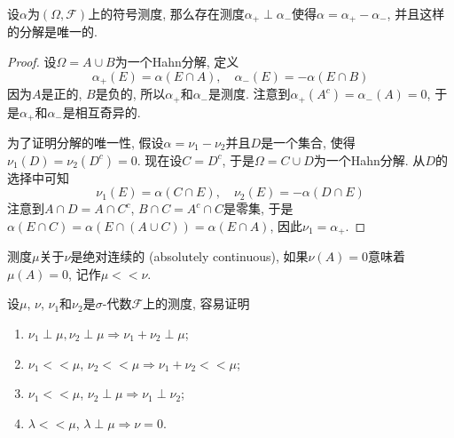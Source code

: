 \documentclass[cn, 12pt, math=mtpro2, bibstyle=apa, blue, twocol]{elegantbook}
\newcommand{\F}{\mathcal{F}}
\begin{document}
\begin{theorem}[Jordan分解定理]
  设$\alpha$为$(\Omega,\F)$上的符号测度, 那么存在测度$\alpha_+\perp\alpha_-$使得$\alpha=\alpha_+-\alpha_-$, 并且这样的分解是唯一的.
\end{theorem}
\begin{proof}
  设$\Omega=A\cup B$为一个Hahn分解, 定义
  $$\alpha_+(E)=\alpha(E\cap A),\quad \alpha_-(E)=-\alpha(E\cap B)$$
  因为$A$是正的, $B$是负的, 所以$\alpha_+$和$\alpha_-$是测度. 注意到$\alpha_+(A^c)=\alpha_-(A)=0$, 于是$\alpha_+$和$\alpha_-$是相互奇异的.

  为了证明分解的唯一性, 假设$\alpha=\nu_1-\nu_2$并且$D$是一个集合, 使得$\nu_1(D)=\nu_2(D^c)=0$. 现在设$C=D^c$, 于是$\Omega=C\cup D$为一个Hahn分解. 从$D$的选择中可知
  $$\nu_1(E)=\alpha(C\cap E),\quad \nu_2(E)=-\alpha(D\cap E)$$
  注意到$A\cap D=A\cap C^c$, $B\cap C=A^c\cap C$是零集, 于是$\alpha(E\cap C)=\alpha(E\cap (A\cup C))=\alpha(E\cap A)$, 因此$\nu_1=\alpha_+$.

\end{proof}
\begin{definition}
测度$\mu$关于$\nu$是绝对连续的 (absolutely continuous), 如果$\nu(A)=0$意味着$\mu(A)=0$, 记作$\mu<<\nu$.
\end{definition}
\begin{example}
设$\mu$, $\nu$, $\nu_1$和$\nu_2$是$\sigma$-代数$\F$上的测度, 容易证明
\begin{enumerate}[label=(\arabic*)]
  \item $\nu_1\perp\mu, \nu_2\perp\mu\Rightarrow \nu_1+\nu_2\perp\mu$;
  \item $\nu_1<<\mu$, $\nu_2<<\mu \Rightarrow \nu_1+\nu_2<<\mu$;
  \item $\nu_1<<\mu$, $\nu_2\perp\mu\Rightarrow \nu_1\perp\nu_2$;
  \item $\lambda<<\mu$, $\lambda\perp\mu\Rightarrow \nu=0$.
\end{enumerate}
\end{example}
\end{document}
